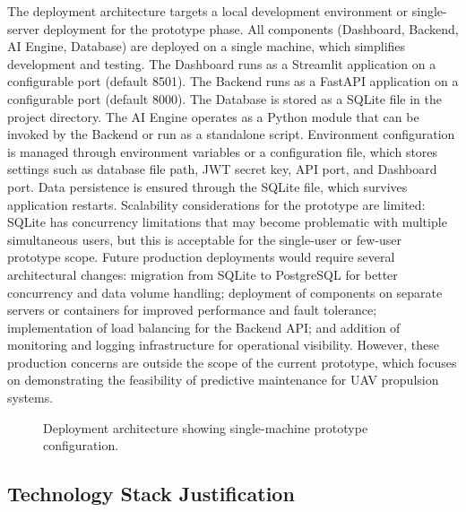 The deployment architecture targets a local development environment or single-server deployment for the prototype phase. All components (Dashboard, Backend, AI Engine, Database) are deployed on a single machine, which simplifies development and testing. The Dashboard runs as a Streamlit application on a configurable port (default 8501). The Backend runs as a FastAPI application on a configurable port (default 8000). The Database is stored as a SQLite file in the project directory. The AI Engine operates as a Python module that can be invoked by the Backend or run as a standalone script. Environment configuration is managed through environment variables or a configuration file, which stores settings such as database file path, JWT secret key, API port, and Dashboard port. Data persistence is ensured through the SQLite file, which survives application restarts. Scalability considerations for the prototype are limited: SQLite has concurrency limitations that may become problematic with multiple simultaneous users, but this is acceptable for the single-user or few-user prototype scope. Future production deployments would require several architectural changes: migration from SQLite to PostgreSQL for better concurrency and data volume handling; deployment of components on separate servers or containers for improved performance and fault tolerance; implementation of load balancing for the Backend API; and addition of monitoring and logging infrastructure for operational visibility. However, these production concerns are outside the scope of the current prototype, which focuses on demonstrating the feasibility of predictive maintenance for UAV propulsion systems.

\begin{figure}[H]
\centering
\caption{Deployment architecture showing single-machine prototype configuration.}
\label{fig:deployment}
\end{figure}

\subsection{Technology Stack Justification}

